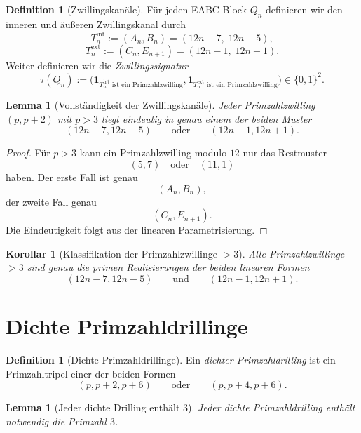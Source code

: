 \documentclass[11pt,a4paper]{article}
\newtheorem{lemma}[theorem]{Lemma}
\newtheorem{corollary}[theorem]{Korollar}
\theoremstyle{definition}
\newtheorem{definition}[theorem]{Definition}
\theoremstyle{remark}
\newcommand{\ind}{\mathbf{1}}
\begin{document}
	\begin{definition}[Zwillingskanäle]
		Für jeden EABC-Block \(Q_n\) definieren wir den inneren und äußeren Zwillingskanal durch
		\[
		T_n^{\mathrm{int}}:=(A_n,B_n)=(12n-7,\;12n-5),
		\]
		\[
		T_n^{\mathrm{ext}}:=(C_n,E_{n+1})=(12n-1,\;12n+1).
		\]
		Weiter definieren wir die \emph{Zwillingssignatur}
		\[
		\tau(Q_n):=
		\bigl(
		\ind_{T_n^{\mathrm{int}}\text{ ist ein Primzahlzwilling}},
		\ind_{T_n^{\mathrm{ext}}\text{ ist ein Primzahlzwilling}}
		\bigr)\in\{0,1\}^2.
		\]
	\end{definition}
	
	\begin{lemma}[Vollständigkeit der Zwillingskanäle]
		Jeder Primzahlzwilling \((p,p+2)\) mit \(p>3\) liegt eindeutig in genau einem der beiden Muster
		\[
		(12n-7,12n-5)
		\qquad\text{oder}\qquad
		(12n-1,12n+1).
		\]
	\end{lemma}
	
	\begin{proof}
		Für \(p>3\) kann ein Primzahlzwilling modulo \(12\) nur das Restmuster
		\[
		(5,7)\quad\text{oder}\quad(11,1)
		\]
		haben.
		Der erste Fall ist genau
		\[
		(A_n,B_n),
		\]
		der zweite Fall genau
		\[
		(C_n,E_{n+1}).
		\]
		Die Eindeutigkeit folgt aus der linearen Parametrisierung.
	\end{proof}
	
	\begin{corollary}[Klassifikation der Primzahlzwillinge \(>3\)]
		Alle Primzahlzwillinge \(>3\) sind genau die primen Realisierungen der beiden linearen Formen
		\[
		(12n-7,12n-5)
		\qquad\text{und}\qquad
		(12n-1,12n+1).
		\]
	\end{corollary}
	
	\section{Dichte Primzahldrillinge}
	
	\begin{definition}[Dichte Primzahldrillinge]
		Ein \emph{dichter Primzahldrilling} ist ein Primzahltripel einer der beiden Formen
		\[
		(p,p+2,p+6)
		\qquad\text{oder}\qquad
		(p,p+4,p+6).
		\]
	\end{definition}
	
	\begin{lemma}[Jeder dichte Drilling enthält \(3\)]
		Jeder dichte Primzahldrilling enthält notwendig die Primzahl \(3\).
	\end{lemma}
	
\end{document}
